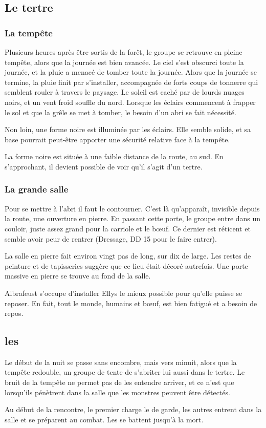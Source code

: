 \documentclass[a4paper,10pt,openany]{book}
\begin{document}
\begin{multicols}{2}
\subsection{Le tertre}
\subsubsection{La tempête}
Plusieurs heures après être sortis de la forêt, le groupe se retrouve en pleine tempête, alors que la journée est bien avancée. Le ciel s’est obscurci
toute la journée, et la pluie a menacé de tomber toute la journée. Alors que la journée se termine, la pluie finit par s’installer, accompagnée de
forts coups de tonnerre qui semblent rouler à travers le paysage. Le soleil est caché par de lourds nuages noirs, et un vent froid souffle du nord.
Lorsque les éclairs commencent à frapper le sol et que la grêle se met à tomber, le besoin d’un abri se fait nécessité.\par 
Non loin, une forme noire est illuminée par les éclairs. Elle semble solide, et sa base pourrait peut-être apporter une sécurité relative face à la
tempête.\par La forme noire est située à une faible distance de la route, au sud. En s’approchant, il devient possible de voir qu’il s’agit d’un
tertre.

\subsubsection{La grande salle}
Pour se mettre à l’abri il faut le contourner. C’est là qu’apparaît, invisible depuis la route, une ouverture en pierre. En passant cette porte, le
groupe entre dans un couloir, juste assez grand pour la carriole et le bœuf. Ce dernier est réticent et semble avoir peur de rentrer (Dressage, DD 15
pour le faire entrer).
\begin{paperbox}{ }
	La salle en pierre fait environ vingt pas de long, sur dix de large. Les restes de peinture et de tapisseries suggère que ce lieu était décoré
	autrefois. Une porte massive en pierre se trouve au fond de la salle.
\end{paperbox}
Albrafeust s’occupe d’installer Ellys le mieux possible pour qu’elle puisse se reposer. En fait, tout le monde, humains et bœuf, est bien fatigué et a
besoin de repos.

\subsection{les \DemiOrcs}
Le début de la nuit se passe sans encombre, mais vers minuit, alors que la tempête redouble, un groupe de \DemiOrcs tente de s’abriter lui aussi dans
le tertre. Le bruit de la tempête ne permet pas de les entendre arriver, et ce n’est que lorsqu’ils pénètrent dans la salle que les monstres peuvent
être détectés.\par Au début de la rencontre, le premier \DemiOrc charge le \PJs de garde, les autres entrent dans la salle et se
préparent au combat. Les \DemiOrcs se battent jusqu’à la mort.


\end{multicols}
\end{document}
